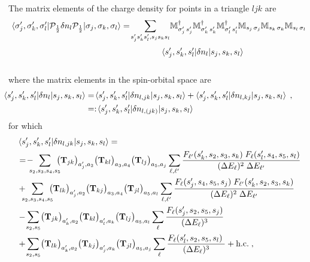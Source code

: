 The matrix elements of the charge density for points in a triangle $ljk$ are
\begin{equation}
\begin{split}
    \braket{\sigma_j',\sigma_k',\sigma_l' | \cP_{\frac12}
 \delta n_l \cP_{\frac12}  | \sigma_j, \sigma_k, \sigma_l}
 &=\!
 \sum_{s_j's_k's_l',s_js_ks_l}\!
 \mathbb{M}_{\sigma_j' \, s_j'}^\dagger   \mathbb{M}_{\sigma_k' \, s_k'}^\dagger
 \mathbb{M}_{\sigma_l' \, s_l'}^\dagger
 \mathbb{M}_{s_j\, \sigma_j}
 \mathbb{M}_{s_k\, \sigma_k}
 \mathbb{M}_{s_l\, \sigma_l}  \\
 &\phantom{\sum_{s_j's_k's_l',s_js_ks_l}}
 \braket{s_j',s_k',s_l' | \delta n_l | s_j, s_k, s_l}
\end{split}
\end{equation}
where the matrix elements in the spin-orbital space are
\begin{align}
    \hspace*{-9mm}
        \braket{s_j',s_k',s_l' | \delta n_l | s_j, s_k, s_l} &=\!
        \braket{s_j',s_k',s_l' | \delta n_{l,jk} | s_j, s_k, s_l}+
        \braket{s_j',s_k',s_l' | \delta n_{l,kj} | s_j, s_k, s_l} \; , \\
        &=:\!
        \braket{s_j',s_k',s_l' | \delta n_{l,(jk)} | s_j, s_k, s_l}
\end{align}
for which
\begin{equation}
    \begin{split}\hspace*{-9mm}
        &\braket{s_j',s_k',s_l' | \delta n_{l,jk} | s_j, s_k, s_l} =\\
        \hspace*{-9mm}        &=\!
        -\!\!\!\!\sum_{s_2,s_3,s_4,s_5} \!\!\!\!
    \big({\mathbf{T}}_{jk} \big)_{ {a}_j', {a}_2} \big({\mathbf{T}}_{kl} \big)_{ {a}_3, {a}_4}\big({\mathbf{T}}_{lj} \big)_{ {a}_5, {a}_j}
    \sum_{\ell, \ell'}\frac{F_{\ell'}(s_k',s_2,s_3,s_k) \; F_{\ell}(s_l',s_4,s_5,s_l) }{ (\Delta E_\ell)^2 \; \Delta E_{ \ell'} }
    \\
    &+\!\!\!\!\sum_{s_2,s_3,s_4,s_5} \!\!\!\!
    \big({\mathbf{T}}_{lk} \big)_{ {a}_j', {a}_2} \big({\mathbf{T}}_{kj} \big)_{ {a}_3, {a}_4}\big({\mathbf{T}}_{jl} \big)_{ {a}_5, {a}_l}
    \sum_{\ell, \ell'}\frac{F_{\ell}(s_j',s_4,s_5,s_j) \; F_{\ell'}(s_k',s_2,s_3,s_k) }{ (\Delta E_\ell)^2 \; \Delta E_{ \ell'} } \\
    & -\!\sum_{s_2,s_5} \!
    \big({\mathbf{T}}_{jk} \big)_{ {a}_k', {a}_2} \big({\mathbf{T}}_{kl} \big)_{ {a}_l', {a}_k}\big({\mathbf{T}}_{lj} \big)_{ {a}_5, {a}_l}
    \sum_{\ell}\frac{F_{\ell}(s_j',s_2,s_5,s_j)  }{ (\Delta E_\ell)^3 }
    \\
    &+\!\sum_{s_2,s_5} \!
    \big({\mathbf{T}}_{lk} \big)_{ {a}_k', {a}_2} \big({\mathbf{T}}_{kj} \big)_{ {a}_j', {a}_k}\big({\mathbf{T}}_{jl} \big)_{ {a}_5, {a}_j}
    \sum_{\ell}\frac{F_{\ell}(s_l',s_2,s_5,s_l) \;  }{ (\Delta E_\ell)^3 } + \text{h.c.}
    \; ,  \label{eq:II-5-dcharge-jk}
    \end{split}
\end{equation}
